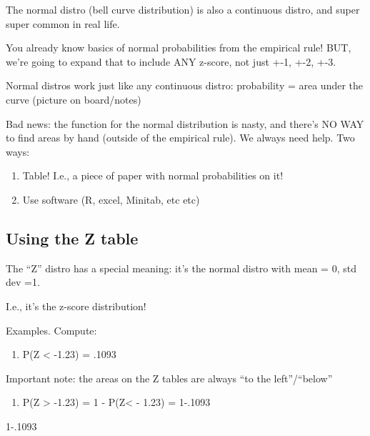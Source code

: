 \documentclass[]{article}
\newenvironment{Shaded}{\begin{snugshade}}{\end{snugshade}}
\newcommand{\DecValTok}[1]{\textcolor[rgb]{0.00,0.00,0.81}{#1}}
\newcommand{\FloatTok}[1]{\textcolor[rgb]{0.00,0.00,0.81}{#1}}
\providecommand{\tightlist}{%
  \setlength{\itemsep}{0pt}\setlength{\parskip}{0pt}}
\begin{document}
The normal distro (bell curve distribution) is also a continuous distro,
and super super common in real life.

You already know basics of normal probabilities from the empirical rule!
BUT, we're going to expand that to include ANY z-score, not just +-1,
+-2, +-3.

Normal distros work just like any continuous distro: probability = area
under the curve (picture on board/notes)

Bad news: the function for the normal distribution is nasty, and there's
NO WAY to find areas by hand (outside of the empirical rule). We always
need help. Two ways:

\begin{enumerate}
\def\labelenumi{\arabic{enumi})}
\tightlist
\item
  Table! I.e., a piece of paper with normal probabilities on it!
\item
  Use software (R, excel, Minitab, etc etc)
\end{enumerate}

\hypertarget{using-the-z-table}{%
\subsection{Using the Z table}\label{using-the-z-table}}

The ``Z'' distro has a special meaning: it's the normal distro with mean
= 0, std dev =1.

I.e., it's the z-score distribution!

Examples. Compute:

\begin{enumerate}
\def\labelenumi{\arabic{enumi})}
\tightlist
\item
  P(Z \textless{} -1.23) = .1093
\end{enumerate}

Important note: the areas on the Z tables are always ``to the
left''/``below''

\begin{enumerate}
\def\labelenumi{\arabic{enumi})}
\setcounter{enumi}{1}
\tightlist
\item
  P(Z \textgreater{} -1.23) = 1 - P(Z\textless{} - 1.23) = 1-.1093
\end{enumerate}

\begin{Shaded}
\begin{Highlighting}[]
\DecValTok{1}\FloatTok{-.1093}
\end{Highlighting}
\end{Shaded}
\end{document}

